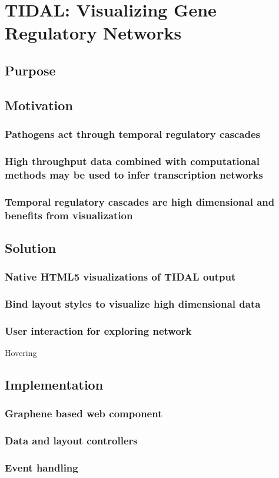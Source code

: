 \chapter{TIDAL: Visualizing Gene Regulatory Networks}

\section{Purpose}


\section{Motivation}
\subsection{Pathogens act through temporal regulatory cascades}
\subsection{High throughput data combined with computational methods may be used to infer transcription networks}
\autocite{zaslavsky2013reconstruction}
\subsection{Temporal regulatory cascades are high dimensional and benefits from visualization}


\section{Solution}
\subsection{Native HTML5 visualizations of TIDAL output}
\subsection{Bind layout styles to visualize high dimensional data}
\subsection{User interaction for exploring network}
Hovering

\section{Implementation}
\subsection{Graphene based web component}
\subsection{Data and layout controllers}
\subsection{Event handling}
